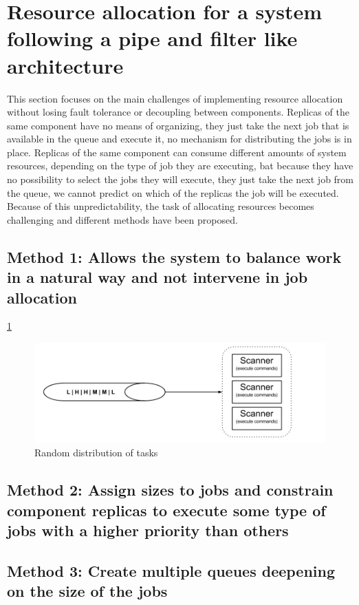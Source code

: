 \documentclass[fleqn,10pt]{./class/wlscirep}
\begin{document}
\section{Resource allocation for a system following a pipe and filter like architecture}
This section focuses on the main challenges of implementing resource allocation without losing fault tolerance or decoupling between components. Replicas of the same component have no means of organizing, they just take the next job that is available in the queue and execute it, no mechanism for distributing the jobs is in place. Replicas of the same component can consume different amounts of system resources, depending on the type of job they are executing, bat because they have no possibility to select the jobs they will execute, they just take the next job from the queue, we cannot predict on which of the replicas the job will be executed. Because of this unpredictability, the task of allocating resources becomes challenging and different methods have been proposed.

\subsection{Method 1: Allows the system to balance work in a natural way and not intervene in job allocation}
\ref{fig:randomDIstributionsOfTasks}

\begin{figure}[ht]
\centering
\includegraphics[width=\linewidth]{./img/1_NaturalLoadBalancing.png}
\caption{Random distribution of tasks}
\label{fig:randomDIstributionsOfTasks}
\end{figure}

\subsection{Method 2: Assign sizes to jobs and constrain component replicas to execute some type of jobs with a higher priority than others}

\subsection{Method 3: Create multiple queues deepening on the size of the jobs}
\end{document}
